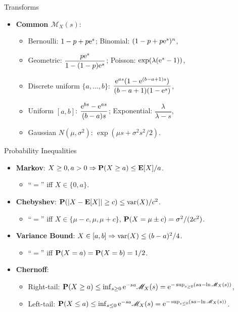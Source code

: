 \documentclass[landscape,a4paper]{article}
\begin{document}
\begin{cheatsheetcolumns}
\begin{card}{Transforms}
\begin{itemize}
\begin{itemize}
					\item $\mathscr{M}_Y(s)=\mathscr{M}_N(\ln\mathscr{M}_X(s))$.
				\end{itemize}
				\item \textbf{Common $\mathscr{M}_X(s)$}:
				\begin{itemize}
					\item Bernoulli: $1-p+p\mathrm{e}^s$; Binomial: $(1-p+p\mathrm{e}^s)^n$,
					\item Geometric: $\dfrac{p\mathrm{e}^s}{1-(1-p)\mathrm{e}^s}$; Poisson: $\exp(\lambda(\mathrm{e}^s-1))$,
					\item Discrete uniform $\{a,\dots,b\}$: $\dfrac{\mathrm{e}^{as}(1-\mathrm{e}^{(b-a+1)s})}{(b-a+1)(1-\mathrm{e}^s)}$,
					\item Uniform $[a,b]$: $\dfrac{\mathrm{e}^{bs}-\mathrm{e}^{as}}{(b-a)s}$; Exponential: $\dfrac{\lambda}{\lambda-s}$,
					\item Gaussian $N(\mu,\sigma^2)$: $\exp(\mu s+\sigma^2s^2/2)$.
				\end{itemize}
			\end{itemize}
		\end{card}
		\begin{card}{Probability Inequalities}
			\begin{itemize}
				\item \textbf{Markov}: $X\ge0,a>0\Rightarrow \mathbf{P}(X\ge a)\le \mathbf{E}[X]/a$.
				\begin{itemize}
					\item ``$=$'' iff $X\in\{0,a\}$.
				\end{itemize}
				\item \textbf{Chebyshev}: $\mathbf{P}(|X-\mathbf{E}[X]|\ge c)\le \operatorname{var}(X)/c^2$.
				\begin{itemize}
					\item ``$=$'' iff $X\in\{\mu-c,\mu,\mu+c\}$, $\mathbf{P}(X=\mu\pm c)=\sigma^2/(2c^2)$.
				\end{itemize}
				\item \textbf{Variance Bound}: $X\in[a,b]\Rightarrow\operatorname{var}(X)\le(b-a)^2/4$.
				\begin{itemize}
					\item ``$=$'' iff $\mathbf{P}(X=a)=\mathbf{P}(X=b)=1/2$.
				\end{itemize}
				\item \textbf{Chernoff}:
				\begin{itemize}
					\item Right-tail: $\mathbf{P}(X\ge a)\le \inf_{s\ge0}\mathrm{e}^{-sa}\mathscr{M}_X(s)=\mathrm{e}^{-\sup_{s\ge0}(sa-\ln\mathscr{M}_X(s))}$,
					\item Left-tail: $\mathbf{P}(X\le a)\le \inf_{s\le0}\mathrm{e}^{-sa}\mathscr{M}_X(s)=\mathrm{e}^{-\sup_{s\le0}(sa-\ln\mathscr{M}_X(s))}$.

\end{itemize}
\end{itemize}
\end{card}
\end{cheatsheetcolumns}
\end{document}
